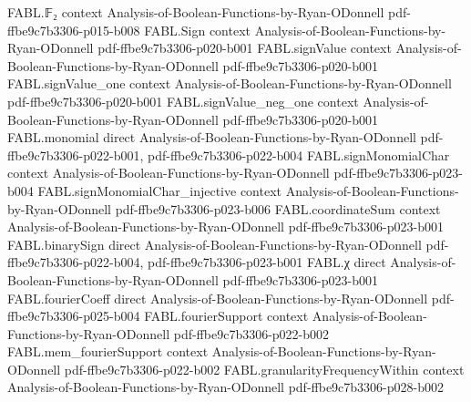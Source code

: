 \begin{theorem}
\label{FABL.pivotalIndicator_eq_discreteDerivative_of_monotone}
\leanok
{}
\proofstep
  {FABL.𝔽₂}
  {context}
  {Analysis-of-Boolean-Functions-by-Ryan-ODonnell}
  {pdf-ffbe9c7b3306-p015-b008}
\proofstep
  {FABL.Sign}
  {context}
  {Analysis-of-Boolean-Functions-by-Ryan-ODonnell}
  {pdf-ffbe9c7b3306-p020-b001}
\proofstep
  {FABL.signValue}
  {context}
  {Analysis-of-Boolean-Functions-by-Ryan-ODonnell}
  {pdf-ffbe9c7b3306-p020-b001}
\proofstep
  {FABL.signValue_one}
  {context}
  {Analysis-of-Boolean-Functions-by-Ryan-ODonnell}
  {pdf-ffbe9c7b3306-p020-b001}
\proofstep
  {FABL.signValue_neg_one}
  {context}
  {Analysis-of-Boolean-Functions-by-Ryan-ODonnell}
  {pdf-ffbe9c7b3306-p020-b001}
\proofstep
  {FABL.monomial}
  {direct}
  {Analysis-of-Boolean-Functions-by-Ryan-ODonnell}
  {pdf-ffbe9c7b3306-p022-b001,
    pdf-ffbe9c7b3306-p022-b004}
\proofstep
  {FABL.signMonomialChar}
  {context}
  {Analysis-of-Boolean-Functions-by-Ryan-ODonnell}
  {pdf-ffbe9c7b3306-p023-b004}
\proofstep
  {FABL.signMonomialChar_injective}
  {context}
  {Analysis-of-Boolean-Functions-by-Ryan-ODonnell}
  {pdf-ffbe9c7b3306-p023-b006}
\proofstep
  {FABL.coordinateSum}
  {context}
  {Analysis-of-Boolean-Functions-by-Ryan-ODonnell}
  {pdf-ffbe9c7b3306-p023-b001}
\proofstep
  {FABL.binarySign}
  {direct}
  {Analysis-of-Boolean-Functions-by-Ryan-ODonnell}
  {pdf-ffbe9c7b3306-p022-b004,
    pdf-ffbe9c7b3306-p023-b001}
\proofstep
  {FABL.χ}
  {direct}
  {Analysis-of-Boolean-Functions-by-Ryan-ODonnell}
  {pdf-ffbe9c7b3306-p023-b001}
\proofstep
  {FABL.fourierCoeff}
  {direct}
  {Analysis-of-Boolean-Functions-by-Ryan-ODonnell}
  {pdf-ffbe9c7b3306-p025-b004}
\proofstep
  {FABL.fourierSupport}
  {context}
  {Analysis-of-Boolean-Functions-by-Ryan-ODonnell}
  {pdf-ffbe9c7b3306-p022-b002}
\proofstep
  {FABL.mem_fourierSupport}
  {context}
  {Analysis-of-Boolean-Functions-by-Ryan-ODonnell}
  {pdf-ffbe9c7b3306-p022-b002}
\proofstep
  {FABL.granularityFrequencyWithin}
  {context}
  {Analysis-of-Boolean-Functions-by-Ryan-ODonnell}
  {pdf-ffbe9c7b3306-p028-b002}

\end{theorem}
